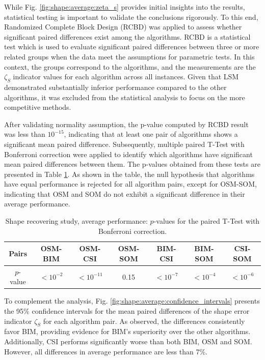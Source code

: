 \documentclass{ieeeaccess}
\begin{document}
            While Fig. \ref{fig:shape:average:zeta_s} provides initial insights into the results, statistical testing is important to validate the conclusions rigorously. To this end, Randomized Complete Block Design (RCBD) was applied to assess whether significant paired differences exist among the algorithms. RCBD is a statistical test which is used to evaluate significant paired differences between three or more related groups when the data meet the assumptions for parametric tests. In this context, the groups correspond to the algorithms, and the measurements are the $\zeta_S$ indicator values for each algorithm across all instances. Given that LSM demonstrated substantially inferior performance compared to the other algorithms, it was excluded from the statistical analysis to focus on the more competitive methods.

            After validating normality assumption, the p-value computed by RCBD result was less than $10^{-15}$, indicating that at least one pair of algorithms shows a significant mean paired difference. Subsequently, multiple paired T-Test with Bonferroni correction were applied to identify which algorithms have significant mean paired differences between them. The p-values obtained from these tests are presented in Table \ref{tab:shape:average:pvalue}. As shown in the table, the null hypothesis that algorithms have equal performance is rejected for all algorithm pairs, except for OSM-SOM, indicating that OSM and SOM do not exhibit a significant difference in their average performance.

            \begin{table}
                \centering
                \renewcommand{\arraystretch}{1.5}
                \caption{Shape recovering study, average performance: $p$-values for the paired T-Test with Bonferroni correction.}
                \label{tab:shape:average:pvalue}
                \begin{tabular}{ccccccc}
                    Pairs & OSM-BIM & OSM-CSI & OSM-SOM & BIM-CSI & BIM-SOM & CSI-SOM \\\hline
                    $p$-value & $<10^{-2}$ & $<10^{-11}$ & 0.15 & $<10^{-7}$ & $<10^{-4}$ & $<10^{-6}$ \\  
                \end{tabular}
            \end{table}

            To complement the analysis, Fig. \ref{fig:shape:average:confidence_intervals} presents the 95\% confidence intervals for the mean paired differences of the shape error indicator $\zeta_S$ for each algorithm pair. As observed, the differences consistently favor BIM, providing evidence for BIM's superiority over the other algorithms. Additionally, CSI performs significantly worse than both BIM, OSM and SOM. However, all differences in average performance are less than 7\%.
\end{document}
